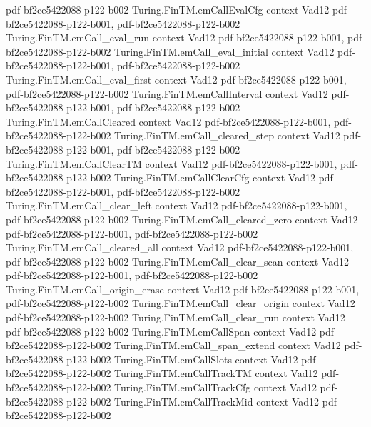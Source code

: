 \begin{theorem}
{    pdf-bf2ce5422088-p122-b002}
\proofstep
  {Turing.FinTM.emCallEvalCfg}
  {context}
  {Vad12}
  {pdf-bf2ce5422088-p122-b001,
    pdf-bf2ce5422088-p122-b002}
\proofstep
  {Turing.FinTM.emCall_eval_run}
  {context}
  {Vad12}
  {pdf-bf2ce5422088-p122-b001,
    pdf-bf2ce5422088-p122-b002}
\proofstep
  {Turing.FinTM.emCall_eval_initial}
  {context}
  {Vad12}
  {pdf-bf2ce5422088-p122-b001,
    pdf-bf2ce5422088-p122-b002}
\proofstep
  {Turing.FinTM.emCall_eval_first}
  {context}
  {Vad12}
  {pdf-bf2ce5422088-p122-b001,
    pdf-bf2ce5422088-p122-b002}
\proofstep
  {Turing.FinTM.emCallInterval}
  {context}
  {Vad12}
  {pdf-bf2ce5422088-p122-b001,
    pdf-bf2ce5422088-p122-b002}
\proofstep
  {Turing.FinTM.emCallCleared}
  {context}
  {Vad12}
  {pdf-bf2ce5422088-p122-b001,
    pdf-bf2ce5422088-p122-b002}
\proofstep
  {Turing.FinTM.emCall_cleared_step}
  {context}
  {Vad12}
  {pdf-bf2ce5422088-p122-b001,
    pdf-bf2ce5422088-p122-b002}
\proofstep
  {Turing.FinTM.emCallClearTM}
  {context}
  {Vad12}
  {pdf-bf2ce5422088-p122-b001,
    pdf-bf2ce5422088-p122-b002}
\proofstep
  {Turing.FinTM.emCallClearCfg}
  {context}
  {Vad12}
  {pdf-bf2ce5422088-p122-b001,
    pdf-bf2ce5422088-p122-b002}
\proofstep
  {Turing.FinTM.emCall_clear_left}
  {context}
  {Vad12}
  {pdf-bf2ce5422088-p122-b001,
    pdf-bf2ce5422088-p122-b002}
\proofstep
  {Turing.FinTM.emCall_cleared_zero}
  {context}
  {Vad12}
  {pdf-bf2ce5422088-p122-b001,
    pdf-bf2ce5422088-p122-b002}
\proofstep
  {Turing.FinTM.emCall_cleared_all}
  {context}
  {Vad12}
  {pdf-bf2ce5422088-p122-b001,
    pdf-bf2ce5422088-p122-b002}
\proofstep
  {Turing.FinTM.emCall_clear_scan}
  {context}
  {Vad12}
  {pdf-bf2ce5422088-p122-b001,
    pdf-bf2ce5422088-p122-b002}
\proofstep
  {Turing.FinTM.emCall_origin_erase}
  {context}
  {Vad12}
  {pdf-bf2ce5422088-p122-b001,
    pdf-bf2ce5422088-p122-b002}
\proofstep
  {Turing.FinTM.emCall_clear_origin}
  {context}
  {Vad12}
  {pdf-bf2ce5422088-p122-b002}
\proofstep
  {Turing.FinTM.emCall_clear_run}
  {context}
  {Vad12}
  {pdf-bf2ce5422088-p122-b002}
\proofstep
  {Turing.FinTM.emCallSpan}
  {context}
  {Vad12}
  {pdf-bf2ce5422088-p122-b002}
\proofstep
  {Turing.FinTM.emCall_span_extend}
  {context}
  {Vad12}
  {pdf-bf2ce5422088-p122-b002}
\proofstep
  {Turing.FinTM.emCallSlots}
  {context}
  {Vad12}
  {pdf-bf2ce5422088-p122-b002}
\proofstep
  {Turing.FinTM.emCallTrackTM}
  {context}
  {Vad12}
  {pdf-bf2ce5422088-p122-b002}
\proofstep
  {Turing.FinTM.emCallTrackCfg}
  {context}
  {Vad12}
  {pdf-bf2ce5422088-p122-b002}
\proofstep
  {Turing.FinTM.emCallTrackMid}
  {context}
  {Vad12}
  {pdf-bf2ce5422088-p122-b002}

\end{theorem}
